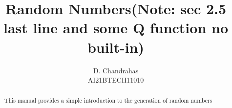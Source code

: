 \documentclass[journal,12pt,twocolumn]{IEEEtran}
\renewcommand\thesection{\arabic{section}}
\begin{document}
\let\StandardTheFigure\thefigure
\renewcommand{\thefigure}{\thesection}



\makeatletter
{}
\makeatother

\let\StandardTheFigure\thefigure
\let\StandardTheTable\thetable
\let\vec\mathbf
{}

\vspace{3cm}


\title{%
	Random Numbers(Note: sec 2.5 last line and some Q function no built-in)
}

%
%
%

\author{D. Chandrahas\\AI21BTECH11010}
\maketitle

\tableofcontents

\bigskip

\renewcommand{\thefigure}{\theenumi}
\renewcommand{\thetable}{\theenumi}

\begin{abstract}
This manual provides a simple introduction to the generation of random numbers
\end{abstract}
\end{document}
